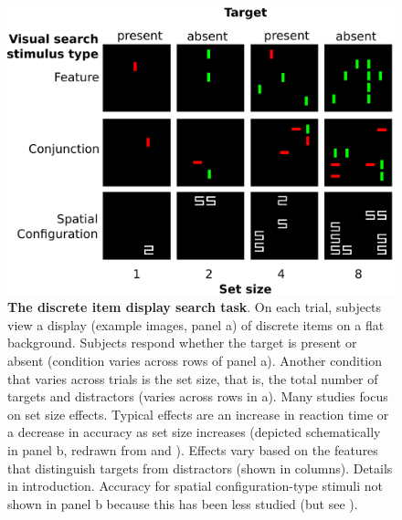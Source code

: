 \documentclass[10pt,letterpaper]{article}
\begin{document}
\begin{figure}[!ht]
\begin{center}
\includegraphics[width=\columnwidth]{fig1/fig1.png}
\end{center}
\caption{
\textbf{The discrete item display search task}. On each trial, subjects view  
 a display (example images, panel a) of discrete items on a flat background. Subjects 
respond whether the target is present or absent (condition varies across rows 
of panel a). Another condition that varies across trials is the set size, that is, 
the total number of targets and distractors (varies across rows in a). Many studies 
focus on set size effects. Typical effects are an increase in reaction time 
or a decrease in accuracy as set size increases (depicted schematically in panel b, 
redrawn from \cite{wolfeReactionTimeDistributions2010} and \cite{ecksteinLowerVisualSearch1998a}). 
Effects vary based on the features that distinguish targets from distractors 
(shown in columns). Details in introduction. Accuracy for spatial configuration-type 
stimuli not shown in panel b because this has been less studied (but see 
\cite{palmerSignalDetectionEvidence2011}).
}
\label{fig1}
\end{figure}
\end{document}
